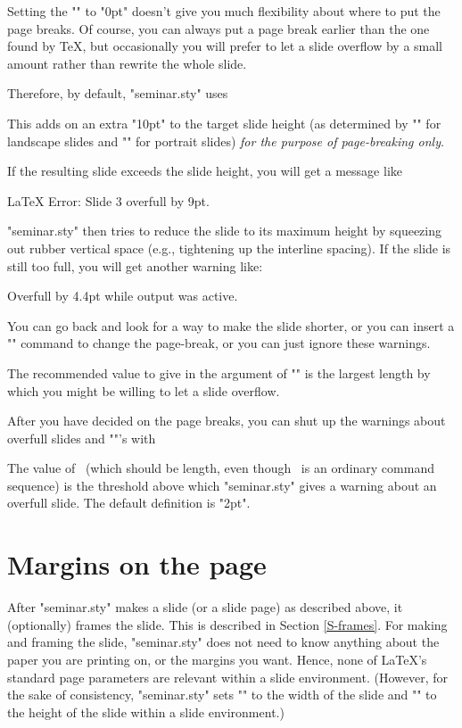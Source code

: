 Setting the "\extraslideheight" to "0pt" doesn't give you much flexibility
about where to put the page breaks. Of course, you can always put a page break
earlier than the one found by \TeX, but occasionally you will prefer to let a
slide overflow by a small amount rather than rewrite the whole slide.

Therefore, by default, "seminar.sty" uses\MainIndex{\extraslideheight}%
\begin{LVerbatim}
  \extraslideheight{10pt}
\end{LVerbatim}
This adds on an extra "10pt" to the target slide height (as determined by
"\slideheight" for landscape slides and "\slidewidth" for portrait slides)
{\em for the purpose of page-breaking only}.

If the resulting slide exceeds the slide height, you will get a message like
\begin{LVerbatim}
  LaTeX Error: Slide 3 overfull by 9pt.
\end{LVerbatim}
"seminar.sty" then tries to reduce the slide to its maximum height by
squeezing out rubber vertical space (e.g., tightening up the interline
spacing). If the slide is still too full, you will get another warning like:
\begin{LVerbatim}
  Overfull \vbox by 4.4pt while output was active.
\end{LVerbatim}
You can go back and look for a way to make the slide shorter, or you can
insert a "\newslide" command to change the page-break, or you can just ignore
these warnings.

The recommended value to give in the argument of "\extraslideheight" is the
largest length by which you might be willing to let  a slide overflow.

After you have decided on the page breaks, you can shut up the warnings about
overfull slides and "\vbox"'s with
\begin{LVerbatim}
  \renewcommand{\slidefuzz}{1in}
\end{LVerbatim}
The value of \n\slidefuzz\ (which should be length, even though \n\slidefuzz\
is an ordinary command sequence) is the threshold above which "seminar.sty"
gives a warning about an overfull slide. The default definition is "2pt".


\section{Margins on the page\label{S-slidemargins}}

After "seminar.sty" makes a slide (or a slide page) as described above, it
(optionally) frames the slide. This is described in Section \ref{S-frames}.
For making and framing the slide, "seminar.sty" does not need to know anything
about the paper you are printing on, or the margins you want. Hence, none of
\LaTeX's standard page parameters are relevant within a slide environment.
(However, for the sake of consistency, "seminar.sty" sets "\textwidth" to the
width of the slide and "\textheight" to the height of the slide within a slide
environment.)

